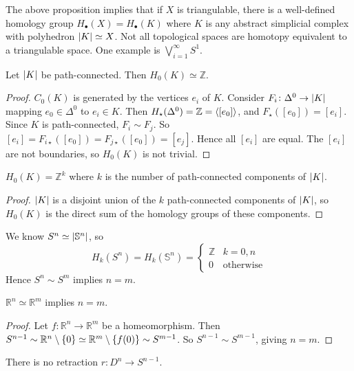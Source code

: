 \begin{remark}
	The above proposition implies that if \( X \) is triangulable, there is a well-defined homology group \( H_\bullet(X) = H_\bullet(K) \) where \( K \) is any abstract simplicial complex with polyhedron \( \abs{K} \simeq X \).
	Not all topological spaces are homotopy equivalent to a triangulable space.
	One example is \( \bigvee_{i=1}^\infty S^1 \).
\end{remark}
\begin{proposition}
	Let \( \abs{K} \) be path-connected.
	Then \( H_0(K) \simeq \mathbb Z \).
\end{proposition}
\begin{proof}
	\( C_0(K) \) is generated by the vertices \( e_i \) of \( K \).
	Consider \( F_i \colon \Delta^0 \to \abs{K} \) mapping \( e_0 \in \Delta^0 \) to \( e_i \in K \).
	Then \( H_\star(\Delta^0) = \mathbb Z = \left\langle{} [e_0] \right\rangle \), and \( F_\star([e_0]) = [e_i] \).
	Since \( K \) is path-connected, \( F_i \sim F_j \).
	So \( [e_i] = F_{i\star}([e_0]) = F_{j\star}([e_0]) = [e_j] \).
	Hence all \( [e_i] \) are equal.
	The \( [e_i] \) are not boundaries, so \( H_0(K) \) is not trivial.
\end{proof}
\begin{corollary}
	\( H_0(K) = \mathbb Z^k \) where \( k \) is the number of path-connected components of \( \abs{K} \).
\end{corollary}
\begin{proof}
	\( \abs{K} \) is a disjoint union of the \( k \) path-connected components of \( \abs{K} \), so \( H_0(K) \) is the direct sum of the homology groups of these components.
\end{proof}
We know \( S^n \simeq \abs{\mathbb S^n} \), so
\[ H_k(S^n) = H_k(\mathbb S^n) = \begin{cases}
	\mathbb Z & k = 0, n \\
	0 & \text{otherwise}
\end{cases} \]
Hence \( S^n \sim S^m \) implies \( n = m \).
\begin{corollary}
	\( \mathbb R^n \simeq \mathbb R^m \) implies \( n = m \).
\end{corollary}
\begin{proof}
	Let \( f \colon \mathbb R^n \to \mathbb R^m \) be a homeomorphism.
	Then \( S^{n-1} \sim \mathbb R^n \setminus \qty{0} \simeq \mathbb R^m \setminus \qty{f(0)} \sim S^{m-1} \).
	So \( S^{n-1} \sim S^{m-1} \), giving \( n = m \).
\end{proof}
\begin{corollary}
	There is no retraction \( r \colon D^n \to S^{n-1} \).
\end{corollary}
